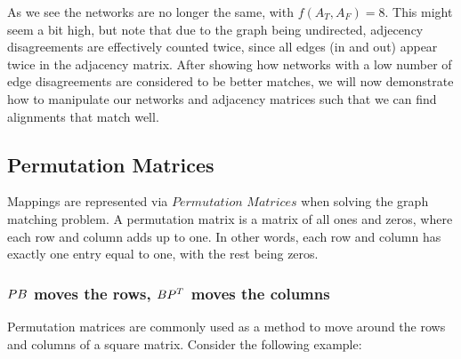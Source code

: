 \documentclass[letterpaper,10pt,english]{jupyterBook}
\begin{document}
\sphinxAtStartPar
{}



\sphinxAtStartPar
As we see the networks are no longer the same, with \(f(A_T,A_F) = 8\). This might seem a bit high, but note that due to the graph being undirected, adjecency disagreements are effectively counted twice, since all edges (in and out) appear twice in the adjacency matrix. After showing how networks with a low number of edge disagreements are considered to be better matches, we will now demonstrate how to manipulate our networks and adjacency matrices such that we can find alignments that match well.


\subsection{Permutation Matrices}
\label{\detokenize{applications/ch9/graph-matching-vertex:permutation-matrices}}
\sphinxAtStartPar
Mappings are represented via \(\textit{Permutation Matrices}\) when solving the graph matching problem. A permutation matrix is a matrix of all ones and zeros, where each row and column adds up to one. In other words, each row and column has exactly one entry equal to one, with the rest being zeros.


\subsubsection{\protect\(PB\protect\) moves the rows, \protect\(BP^T\protect\) moves the columns}
\label{\detokenize{applications/ch9/graph-matching-vertex:pb-moves-the-rows-bp-t-moves-the-columns}}
\sphinxAtStartPar
Permutation matrices are commonly used as a method to move around the rows and columns of a square matrix. Consider the following example:
\end{document}
